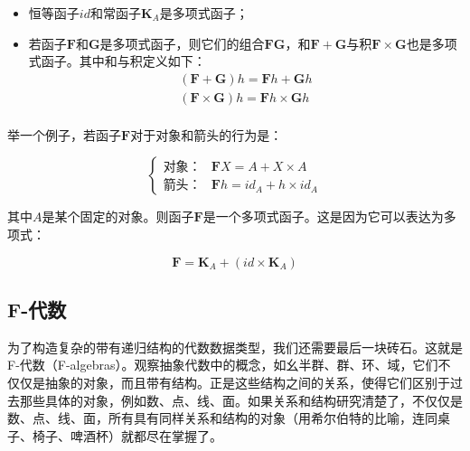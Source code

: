 \documentclass{article}
\begin{document}
\begin{itemize}
  \item 恒等函子$id$和常函子$\mathbf{K}_A$是多项式函子；
  \item 若函子$\mathbf{F}$和$\mathbf{G}$是多项式函子，则它们的组合$\mathbf{FG}$，和$\mathbf{F} + \mathbf{G}$与积$\mathbf{F} \times \mathbf{G}$也是多项式函子。其中和与积定义如下：
  \[
    \begin{array}{l}
    (\mathbf{F} + \mathbf{G}) h = \mathbf{F} h + \mathbf{G} h \\
    (\mathbf{F} \times \mathbf{G}) h = \mathbf{F} h \times \mathbf{G} h \\
    \end{array}
  \]
\end{itemize}

举一个例子，若函子$\mathbf{F}$对于对象和箭头的行为是：

\[
\begin{cases}
\text{对象：} & \mathbf{F} X = A + X \times A \\
\text{箭头：} & \mathbf{F} h = id_A + h \times id_A
\end{cases}
\]

其中$A$是某个固定的对象。则函子$\mathbf{F}$是一个多项式函子。这是因为它可以表达为多项式：

\[
\mathbf{F} = \mathbf{K}_A + (id \times \mathbf{K}_A)
\]

\subsection{F-代数}

为了构造复杂的带有递归结构的代数数据类型，我们还需要最后一块砖石。这就是F-代数（F-algebras）。观察抽象代数中的概念，如幺半群、群、环、域，它们不仅仅是抽象的对象，而且带有结构。正是这些结构之间的关系，使得它们区别于过去那些具体的对象，例如数、点、线、面。如果关系和结构研究清楚了，不仅仅是数、点、线、面，所有具有同样关系和结构的对象（用希尔伯特的比喻，连同桌子、椅子、啤酒杯）就都尽在掌握了。
\end{document}
